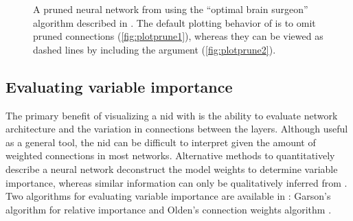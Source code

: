 \documentclass[article]{jss}
\begin{document}
\begin{figure}[t!]
\caption{A pruned neural network from  \citep{Bergmeir12}
  using the ``optimal brain surgeon'' algorithm described in
  \citet{Zell98}.  The default plotting behavior of  is
  to omit pruned connections (\ref{fig:plotprune1}), whereas they can
  be viewed as dashed lines by including the 
  argument (\ref{fig:plotprune2}).}
\label{fig:plotprune}
\end{figure}

\subsection{Evaluating variable importance}

The primary benefit of visualizing a \ac{nid} with  is the ability to evaluate network architecture and the variation in connections between the layers.  Although useful as a general tool, the \ac{nid} can be difficult to interpret given the amount of weighted connections in most networks.  Alternative methods to quantitatively describe a neural network deconstruct the model weights to determine variable importance, whereas similar information can only be qualitatively inferred from .  Two algorithms for evaluating variable importance are available in : Garson's algorithm for relative importance \citep{Garson91,Goh95} and Olden's connection weights algorithm \citep{Olden04}.
\end{document}
